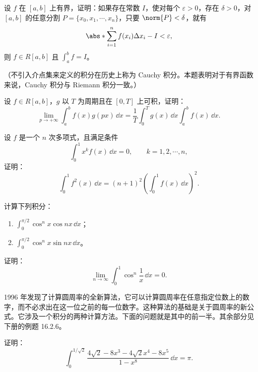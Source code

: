 \begin{xreferenceproblem}[3]
设 $f$ 在 $[a,b]$ 上有界，证明：如果存在常数 $I$，使对每个 $\varepsilon>0$，存在 $\delta>0$，对 $[a,b]$ 的任意分割 $P=\{x_0,x_1,\cdots,x_n\}$，只要 $\norm{P}<\delta$，就有
\[
  \abs*{\sum_{i=1}^n f(x_i)\Delta x_i-I}<\varepsilon,
\]
则 $f\in R[a,b]$ 且 $\int_a^b f=I$。

（不引入介点集来定义的积分在历史上称为 Cauchy 积分。本题表明对于有界函数来说，Cauchy 积分与 Riemann 积分一致。）
\end{xreferenceproblem}

\begin{xreferenceproblem}[4（Riemann 定理）]
设 $f\in R[a,b]$，$g$ 以 $T$ 为周期且在 $[0,T]$ 上可积，证明：
\[
  \lim_{p\to+\infty}\int_a^b f(x)g(px)\,\dd x
  =\frac1T\int_0^T g(x)\,\dd x\int_a^b f(x)\,\dd x.
\]
\end{xreferenceproblem}

\begin{xreferenceproblem}[5]
设 $f$ 是一个 $n$ 次多项式，且满足条件
\[
  \int_0^1x^kf(x)\,\dd x=0,\qquad k=1,2,\cdots,n,
\]
证明：
\[
  \int_0^1f^2(x)\,\dd x=(n+1)^2\left(\int_0^1f(x)\,\dd x\right)^2.
\]
\end{xreferenceproblem}

\begin{xreferenceproblem}[6]
计算下列积分：
\begin{enumerate}[label=(\arabic*)]
  \item $\displaystyle\int_0^{\pi/2}\cos^n x\cos nx\,\dd x$；
  \item $\displaystyle\int_0^{\pi/2}\cos^n x\sin nx\,\dd x$。
\end{enumerate}
\end{xreferenceproblem}

\begin{xreferenceproblem}[7]
证明：
\[
  \lim_{n\to\infty}\int_0^1\cos^n\frac1x\,\dd x=0.
\]
\end{xreferenceproblem}

\begin{xreferenceproblem}[8]
1996 年发现了计算圆周率的全新算法，它可以计算圆周率在任意指定位数上的数字，而不必求出在这一位之前的每一位数字。这种算法的基础是关于圆周率的新公式。它涉及一个积分的两种计算方法。下面的问题就是其中的前一半。其余部分见下册的例题 16.2.6。

证明：
\[
  \int_0^{1/\sqrt2}\frac{4\sqrt2-8x^3-4\sqrt2x^4-8x^5}{1-x^8}\,\dd x=\pi.
\]
\end{xreferenceproblem}


